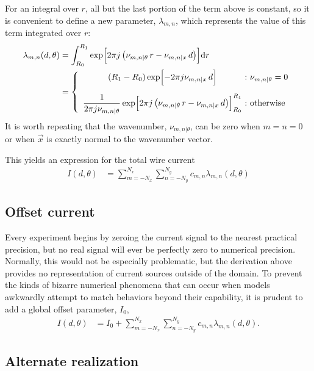 \documentclass{article}
\def\d{\mathrm{d}}
\def\x{\vec{x}}
\def\nuth{\nu_{m,n|\theta}}
\begin{document}
For an integral over $r$, all but the last portion of the term above is constant, so it is convenient to define a new parameter, $\lambda_{m,n}$, which represents the value of this term integrated over $r$:
\begin{align}
\lambda_{m,n}(d,\theta) &= \int_{R_0}^{R_1} \exp\Bigl[2\pi j \left(\nuth\,r - \nu_{m,n|x}\,d\right)\Bigr] \d r \nonumber\\
 &= \left\{\begin{array}{c@{\ :\ }l}
 \displaystyle (R_1 - R_0) \exp\Bigl[-2\pi j \nu_{m,n|x}\,d\Bigr] & \nuth = 0  \vspace{1.0em} \\
\displaystyle \frac{1}{2\pi j \nuth}\exp\Bigl[2\pi j \left(\nuth\,r - \nu_{m,n|x}\,d\right)\Bigr]^{R_1}_{R_0} & \mathrm{otherwise}
\end{array}
\right.
\end{align}
It is worth repeating that the wavenumber, $\nuth$, can be zero when $m=n=0$ or when $\x$ is exactly normal to the wavenumber vector.

This yields an expression for the total wire current
\begin{align}
I(d,\theta) &= \sum_{m=-N_x}^{N_x} \sum_{n=-N_y}^{N_y} c_{m,n} \lambda_{m,n}(d,\theta)
\end{align}

\subsection{Offset current}

Every experiment begins by zeroing the current signal to the nearest practical precision, but no real signal will ever be perfectly zero to numerical precision.  Normally, this would not be especially problematic, but the derivation above provides no representation of current sources outside of the domain.  To prevent the kinds of bizarre numerical phenomena that can occur when models awkwardly attempt to match behaviors beyond their capability, it is prudent to add a global offset parameter, $I_0$,  
\begin{align}
I(d,\theta) &= I_0 + \sum_{m=-N_x}^{N_x} \sum_{n=-N_y}^{N_y} c_{m,n} \lambda_{m,n}(d,\theta)\label{eqn:I}.
\end{align}

\subsection{Alternate realization}
\end{document}
